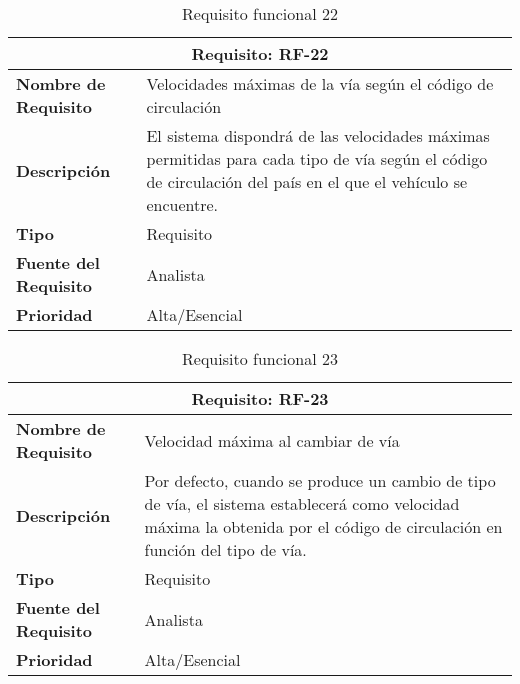 \begin{table}[H]
\begin{center}
\begin{tabular}{p{} p{7cm}}
\multicolumn{2}{c}{\textbf{Requisito: RF-22} } \\
\hline \hline
\textbf{Nombre de Requisito} & Velocidades máximas de la vía según el código de circulación  \\
\hline
\textbf{Descripción} & El sistema dispondrá de las velocidades máximas permitidas para cada tipo de vía según el código de circulación del país en el que el vehículo se encuentre. \\
\hline
\textbf{Tipo} & Requisito \\
\hline
\textbf{Fuente del Requisito} & Analista \\
\hline
\textbf{Prioridad} & Alta/Esencial \\ \hline
\end{tabular}
\caption{Requisito funcional 22}
\label{tab:RF-22}
\end{center}
\end{table}


\begin{table}[H]
\begin{center}
\begin{tabular}{p{} p{7cm}}
\multicolumn{2}{c}{\textbf{Requisito: RF-23} } \\
\hline \hline
\textbf{Nombre de Requisito} & Velocidad máxima al cambiar de vía  \\
\hline
\textbf{Descripción} & Por defecto, cuando se produce un cambio de tipo de vía, el sistema establecerá como velocidad máxima la obtenida por el código de circulación en función del tipo de vía.\\
\hline
\textbf{Tipo} & Requisito \\
\hline
\textbf{Fuente del Requisito} & Analista \\
\hline
\textbf{Prioridad} & Alta/Esencial \\ \hline
\end{tabular}
\caption{Requisito funcional 23}
\label{tab:RF-23}
\end{center}
\end{table}

